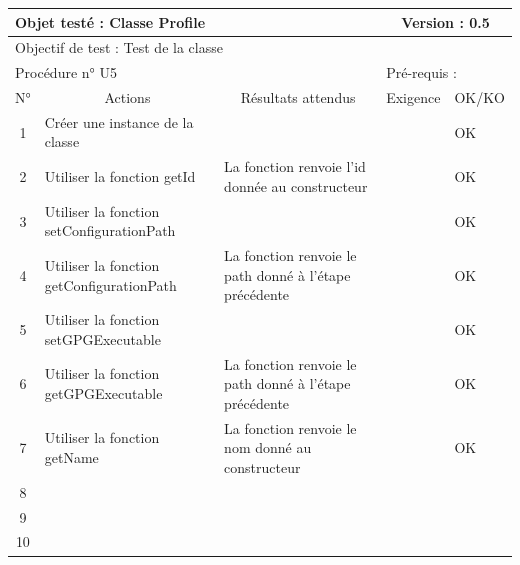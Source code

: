 \documentclass{../res/univ-projet}
\begin{document}
\begin{center}
    \begin{tabular}{|c|p{5cm}|p{5cm}|p{1.5cm}|p{1.5cm}|}
      \hline
      \multicolumn{3}{|l|}{Objet testé : Classe Profile} & \multicolumn{2}{c|}{Version : 0.5}\\ \hline
      \multicolumn{5}{|l|}{Objectif de test : Test de la classe}\\ \hline
      \multicolumn{3}{|l|}{Procédure n° U5} & \multicolumn{2}{p{3cm}|}{Pré-requis : }\\ \hline
      \multicolumn{1}{|c|}{N°} & \multicolumn{1}{c|}{Actions} & \multicolumn{1}{c|}{Résultats attendus} & 
      \multicolumn{1}{c|}{Exigence} & \multicolumn{1}{c|}{OK/KO}\\ \hline
      1 & Créer une instance de la classe &  &  & OK \\
      2 & Utiliser la fonction getId & La fonction renvoie l'id donnée au constructeur &  & OK \\
      3 & Utiliser la fonction setConfigurationPath &  &  & OK \\
      4 & Utiliser la fonction getConfigurationPath & La fonction renvoie le path donné à l'étape précédente &  & OK \\
      5 & Utiliser la fonction setGPGExecutable &  &  & OK \\
      6 & Utiliser la fonction getGPGExecutable & La fonction renvoie le path donné à l'étape précédente &  & OK \\
      7 & Utiliser la fonction getName & La fonction renvoie le nom donné au constructeur &  & OK \\
      8 &  &  &  &  \\
      9 &  &  &  & \\
      10 &  &  &  &\\ 
  \hline
    \end{tabular}
    \vskip 2.2cm
    

\end{center}
\end{document}
